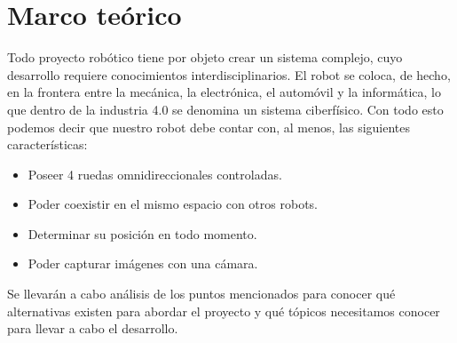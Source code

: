 
\chapter{Marco teórico}

Todo proyecto robótico tiene por objeto crear un sistema complejo, cuyo desarrollo requiere conocimientos interdisciplinarios. El robot se coloca, de hecho, en la frontera entre la mecánica, la electrónica, el automóvil y la informática, lo que dentro de la industria 4.0 se denomina un sistema ciberfísico. Con todo esto podemos decir que nuestro robot debe contar con, al menos, las siguientes características:

\begin{itemize}
    \item Poseer 4 ruedas omnidireccionales controladas.
    \item Poder coexistir en el mismo espacio con otros robots.
    \item Determinar su posición en todo momento.
    \item Poder capturar imágenes con una cámara.
\end{itemize}

Se llevarán a cabo análisis de los puntos mencionados para conocer qué alternativas existen para abordar el proyecto y qué tópicos necesitamos conocer para llevar a cabo el desarrollo.








